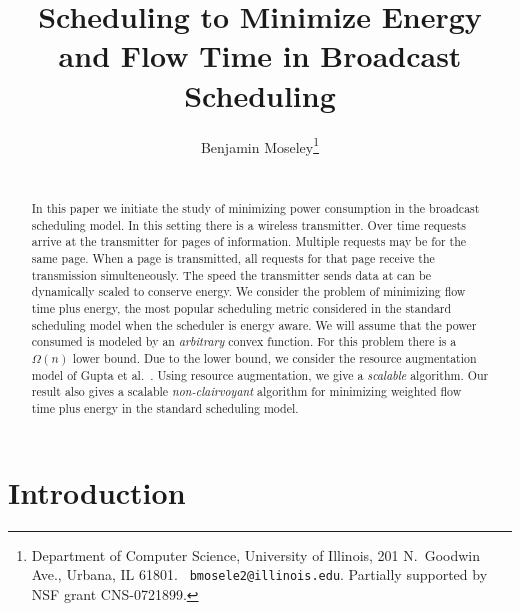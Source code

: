 \documentclass[11pt]{article}
\newcommand{\etal}{et al.\ }
\begin{document}
\title{Scheduling to Minimize Energy and Flow Time in Broadcast Scheduling }


\author{
Benjamin Moseley\thanks{Department of Computer Science, University of
Illinois, 201 N.\ Goodwin Ave., Urbana, IL 61801. {\tt
bmosele2@illinois.edu}. Partially supported by NSF grant
CNS-0721899.}\\\\\vspace{4mm} 
}


\date{}
\maketitle \vspace{-7mm}

\begin{abstract}








In this paper we initiate the study of minimizing power consumption in the broadcast scheduling model.  In this setting there is a wireless transmitter.  Over time requests arrive at the transmitter for pages of information.  Multiple requests may be for the same page.  When a page is transmitted, all requests for that page receive the transmission simulteneously.  The speed the transmitter sends data at can be dynamically scaled to conserve energy.  We consider the problem of minimizing flow time plus energy, the most popular scheduling metric considered in the standard scheduling model when the scheduler is energy aware.   We will assume that the power consumed is modeled by an \emph{arbitrary} convex function. For this problem there is a $\Omega(n)$ lower bound.  Due to the lower bound, we consider the resource augmentation model of Gupta \etal \cite{GuptaKP10}.  Using resource augmentation, we give a \emph{scalable} algorithm.  Our result also gives a scalable \emph{non-clairvoyant} algorithm for minimizing weighted flow time plus energy in the standard scheduling model.









\end{abstract}

\setcounter{page}{0} \thispagestyle{empty} \clearpage



\section{Introduction}
\end{document}
